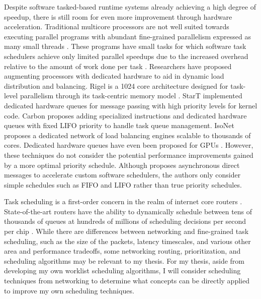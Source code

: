 Despite software tasked-based runtime systems already achieving a high degree of speedup, there is still room for even 
more improvement through hardware acceleration. Traditional multicore processors are not well suited towards executing 
parallel programs with abundant fine-grained parallelism expressed as many small threads \cite{isonet}. These programs 
have small tasks for which software task schedulers achieve only limited parallel speedups due to the increased 
overhead relative to the amount of work done per task \cite{carbon}. Researchers have proposed augmenting processors 
with dedicated hardware to aid in dynamic load distribution and balancing. Rigel is a 1024 core architecture designed 
for task-level parallelism through its task-centric memory model \cite{rigel}. StarT \cite{starT} implemented 
dedicated hardware queues for message passing with high priority levels for kernel code. Carbon \cite{carbon} proposes adding 
specialized instructions and dedicated hardware queues with fixed LIFO priority to handle task queue management. 
IsoNet \cite{isonet} proposes a dedicated network of load balancing engines scalable to thousands of cores. Dedicated 
hardware queues have even been proposed for GPUs \cite{gpuWorklist}. However, these techniques do not consider the 
potential performance improvements gained by a more optimal priority schedule. Although \cite{adm} proposes 
asynchronous direct messages to accelerate custom software schedulers, the authors only consider simple schedules such 
as FIFO and LIFO rather than true priority schedules.

Task scheduling is a first-order concern in the realm of internet core routers \cite{routerQoS}. State-of-the-art 
routers have the ability to dynamically schedule between tens of thousands of queues at hundreds of millions of 
scheduling decisions per second per chip \cite{router1tbps}. While there are differences between networking and 
fine-grained task scheduling, such as the size of the packets, latency timescales, and various other area and 
performance tradeoffs, some networking routing, prioritization, and scheduling algorithms may be relevant to my 
thesis. For my thesis, aside from developing my own worklist scheduling algorithms, I will consider scheduling 
techniques from networking to determine what concepts can be directly applied to improve my own scheduling techniques.
